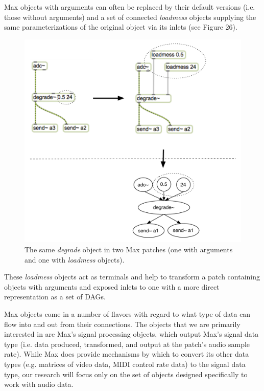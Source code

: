 \documentclass[12pt]{report} 	%
\numberwithin{figure}{chapter}
\numberwithin{table}{chapter}
\numberwithin{equation}{chapter}
\begin{document}
\begin{flushleft}
Max objects with arguments can often be replaced by their default versions (i.e. those without arguments) and a set of connected \textit{loadmess} objects supplying the same parameterizations of the original object via its inlets (see Figure 26). 
\begin{figure}[h!]
\begin{center}
\includegraphics[scale=0.7]{MaxDAGsLoadmess}
\caption[Using \textit{loadmess} objects to provide parameters to Max]{The same \textit{degrade\texttildelow{}} object in two Max patches (one with arguments and one with \textit{loadmess} objects).}
\end{center}
\vspace{6pt}
\end{figure}
These \textit{loadmess} objects act as terminals and help to transform a patch containing objects with arguments and exposed inlets to one with a more direct representation as a set of DAGs.

Max objects come in a number of flavors with regard to what type of data can flow into and out from their connections. The objects that we are primarily interested in are Max's signal processing objects, which output Max's signal data type (i.e. data produced, transformed, and output at the patch's audio sample rate). While Max does provide mechanisms by which to convert its other data types (e.g. matrices of video data, MIDI control rate data) to the signal data type, our research will focus only on the set of objects designed specifically to work with audio data. 


\end{flushleft}
\end{document}
